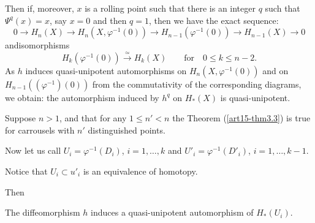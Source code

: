 Then if, moreover, $x$ is a rolling point such that there is an integer $q$ such that $\Psi^q(x) =x$, say $x =0$ and then $q =1$, then we have the exact sequence:
$$
0 \to H_n (X) \to H_n (X, \varphi^{-1}(0)) \to H_{n-1} (\varphi^{-1} (0)) \to H_{n-1} (X) \to 0
$$
and\pageoriginale isomorphisms
$$
H_k (\varphi^{-1} (0)) \xrightarrow{\simeq} H_k (X) \qquad \text{for} \quad 0 \leqslant k \leqslant n-2.
$$
As $h$ induces quasi-unipotent automorphisms on $H_n (X, \varphi^{-1}(0))$ and on $H_{n-1} ((\varphi^{-1}) (0))$ from the commutativity of the corresponding diagrams, we obtain: the automorphism induced by $h^q$ on $H_*(X)$  is quasi-unipotent.

Suppose $n >1$, and that for any $1 \leqslant n' < n$ the Theorem (\ref{art15-thm3.3}) is true for carrousels with $n'$ distinguished points.

Now let us call $U_i = \varphi^{-1} (D_i)$, $i =1, \ldots, k$ and $U'_i= \varphi^{-1} (D'_i)$, $i=1, \ldots, k-1$.
     
Notice that $U_i \subset u'_i$ is an equivalence of homotopy.

Then

\begin{lemma}\label{art15-lem3.4}
The diffeomorphism $h$ induces a quasi-unipotent automorphism of $H_*(U_i)$.
\end{lemma}

